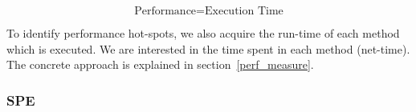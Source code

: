 \begin{equation}
	\label{def:perf2}
	\mbox{Performance}=\mbox{Execution Time}
\end{equation}

To identify performance hot-spots, we also acquire the run-time of each method which is executed.
We are interested in the time spent in each method (net-time).
The concrete approach is explained in section~\ref{perf_measure}. 


\subsubsection{\ac{SPE}}

